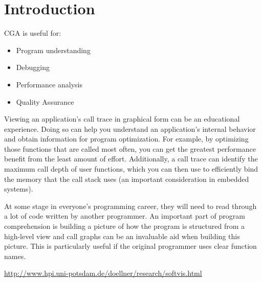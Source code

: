 
\section{Introduction}

CGA is useful for:

\begin{itemize}
	\item Program understanding
	\item Debugging
	\item Performance analysis
	\item Quality Assurance
\end{itemize}


Viewing an application's call trace in graphical form can be an educational experience. Doing so can help you understand an application's internal behavior and obtain information for program optimization. For example, by optimizing those functions that are called most often, you can get the greatest performance benefit from the least amount of effort. Additionally, a call trace can identify the maximum call depth of user functions, which you can then use to efficiently bind the memory that the call stack uses (an important consideration in embedded systems).

At some stage in everyone's programming career, they will need to read through a lot of code written by another programmer. An important part of program comprehension is building a picture of how the program is structured from a high-level view and call graphs can be an invaluable aid when building this picture. This is particularly useful if the original programmer uses clear function names.

\url{http://www.hpi.uni-potsdam.de/doellner/research/softvis.html}

